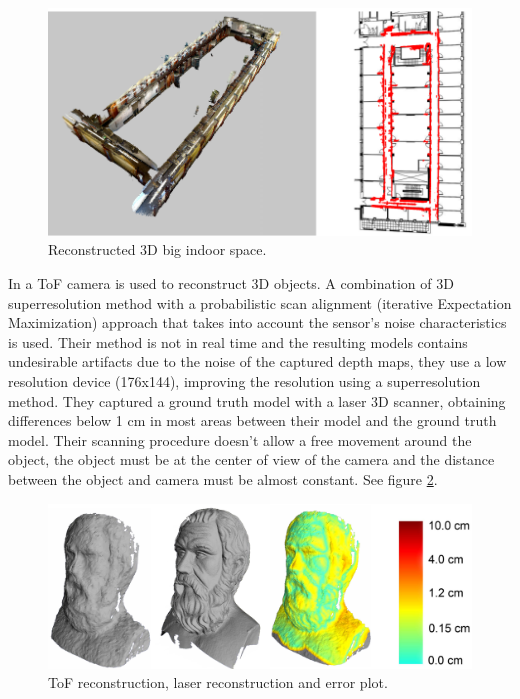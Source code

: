 \begin{figure}[h!]
\begin{center}
\includegraphics[scale=0.29]{images/henry}\caption{Reconstructed 3D big indoor space.}
\label{fig:henry}
\end{center}
\end{figure}

%
In \cite{cui} a ToF camera is used to reconstruct 3D objects. A combination of 3D superresolution method with a 
probabilistic scan alignment (iterative Expectation Maximization) approach that takes into account the sensor's 
noise characteristics is used. Their method is not in real time and the resulting models contains undesirable 
artifacts due to  the noise of the captured depth maps, they use a low resolution device (176x144), 
improving the resolution using a superresolution method. They captured a ground truth model with a laser 3D scanner, 
obtaining differences below 1 cm in most areas between their model and the ground truth model. Their scanning 
procedure doesn't allow a free movement around the object, the object must be at the center of view of the camera 
and the distance between the object and camera must be almost constant. See figure \ref{fig:cui}.

\begin{figure}[h!]
\begin{center}
\includegraphics[scale=0.23]{images/cui}
\caption{ToF reconstruction, laser reconstruction and error plot.}
\label{fig:cui}
\end{center}
\end{figure}

